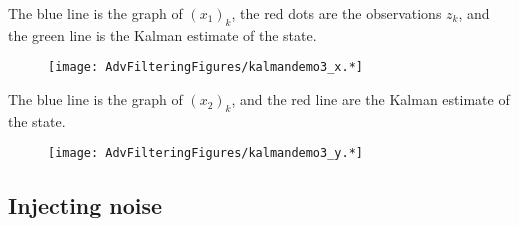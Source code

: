 \begin{Shaded}
\begin{Highlighting}[]
\OperatorTok{=}\OperatorTok{,}\OperatorTok{,}\OperatorTok{=}
\OperatorTok{=}\OperatorTok{,}\NormalTok{ x\_sim[}\OperatorTok{,:}\NormalTok{]}\OperatorTok{,}\OperatorTok{=} \OperatorTok{,}\OperatorTok{=} \OperatorTok{,}\OperatorTok{=} \NormalTok{)}
\OperatorTok{!}\OperatorTok{,}
\OperatorTok{!}\OperatorTok{,}\NormalTok{x\_estimate[}\OperatorTok{,:}\NormalTok{])}
\NormalTok{)}

\OperatorTok{=}\OperatorTok{,}\NormalTok{ x\_sim[}\OperatorTok{,:}\NormalTok{]}\OperatorTok{,}\OperatorTok{=} \OperatorTok{,}\OperatorTok{=} \OperatorTok{,}\OperatorTok{=} \NormalTok{)}
\OperatorTok{!}\OperatorTok{,}\NormalTok{x\_estimate[}\OperatorTok{,:}\NormalTok{])}
\NormalTok{)}
\end{Highlighting}
\end{Shaded}

The blue line is the graph of \((x_1)_k\), the red dots are the
observations \(z_k\), and the green line is the Kalman estimate of the
state.

\begin{figure}
\centering
\texttt{[image: AdvFilteringFigures/kalmandemo3\_x.*]}
\caption{}
\end{figure}

The blue line is the graph of \((x_2)_k\), and the red line are the
Kalman estimate of the state.

\begin{figure}
\centering
\texttt{[image: AdvFilteringFigures/kalmandemo3\_y.*]}
\caption{}
\end{figure}

\hypertarget{injecting-noise}{%
\subsection{Injecting noise}\label{injecting-noise}}

